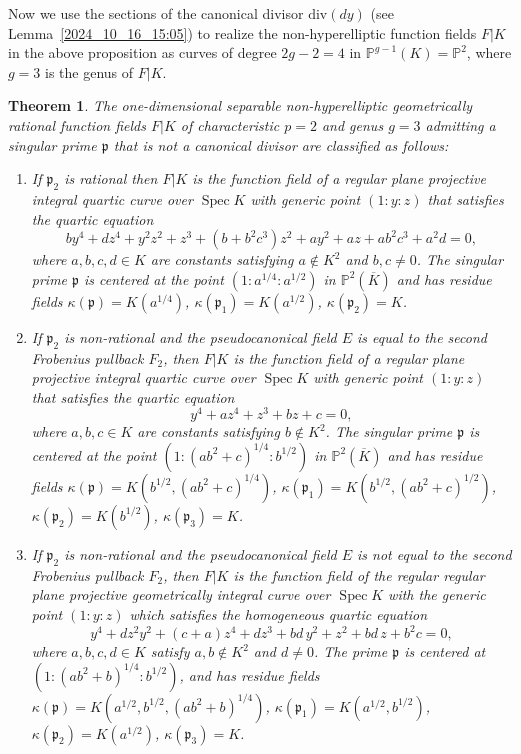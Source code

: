 \documentclass[12pt,reqno]{amsart}
\newtheorem{thm}{Theorem}[section]
\theoremstyle{definition}
\newcommand{\ov}{\overline}
\newcommand{\PP}{\mathbb{P}}
\newcommand{\pp}{\mathfrak{p}}
\newcommand{\ka}{\kappa}
\DeclareMathOperator{\Spec}{Spec}%
\begin{document}
Now we use the sections of the canonical divisor $\mathrm{div}(dy)$ (see Lemma~\ref{2024_10_16_15:05}) to realize the non-hyperelliptic function fields $F|K$ in the above proposition as curves of degree $2g-2=4$ in $\PP^{g-1}(K) = \PP^2$, where $g=3$ is the genus of $F|K$.

\begin{thm}\label{2024_05_27_00:10}
The one-dimensional separable non-hyperelliptic geometrically rational function fields $F|K$ of characteristic $p=2$ and genus $g=3$ admitting a singular prime $\pp$ that is not a canonical divisor are classified as follows:
\begin{enumerate}[\upshape (a)]
    \item \label{2024_05_27_00:11}
    If $\pp_2$ is rational then $F|K$ is the function field of a regular plane projective integral quartic curve over $\Spec K$ with generic point $(1: y : z)$ that satisfies the quartic equation
    \[ b y^4 + d z^4 + y^2 z^2 + z^3 + (b + b^2 c^3) z^2 + a y^2 + a z + a b^2 c^3 + a^2 d = 0, \]
    where $a,b,c,d\in K$ are constants satisfying $a\notin K^2$ and $b,c\neq 0$.
    The singular prime $\pp$ is centered at the point $(1:a^{1/4}:a^{1/2})$ in $\PP^2(\ov K)$ and has residue fields $\ka(\pp)=K(a^{1/4})$, $\ka(\pp_1)=K(a^{1/2})$, $\ka(\pp_2) = K$.
    
    \item \label{2024_05_27_00:12}
    If $\pp_2$ is non-rational and the pseudocanonical field $E$ is equal to the second Frobenius pullback $F_2$, then $F|K$ is the function field of a regular plane projective integral quartic curve over $\Spec K$ with generic point $(1:y:z)$ that satisfies the quartic equation
    \[ y^4 + a z^4 + z^3 + b z + c = 0, \]
    where $a,b,c \in K$ are constants satisfying $b \notin K^2$.
    The singular prime $\pp$ is centered at the point $(1:(a b^2 + c)^{1/4} : b^{1/2})$ in $\PP^2(\ov K)$ and has residue fields $\ka(\pp)=K(b^{1/2}, (a b^2 + c)^{1/4})$, $\ka(\pp_1)=K(b^{1/2}, (a b^2 + c)^{1/2})$, $\ka(\pp_2) = K(b^{1/2})$, $\ka(\pp_3)=K$.
    
    \item \label{2024_05_27_00:13}
    If $\pp_2$ is non-rational and the pseudocanonical field $E$ is not equal to the second Frobenius pullback $F_2$,
    then $F|K$ is the function field of the regular regular plane projective geometrically integral curve over $\Spec K$ with the generic point $(1:y:z)$ which satisfies the homogeneous quartic equation
    \[ y^4 + d z^2 y^2 + (c+a) z^4 + d z^3 + bd\, y^2 + z^2 + bd\, z + b^2 c = 0, \]
    where $a,b,c,d\in K$ satisfy $a,b\notin K^2$ and $d\neq 0$.
    The prime $\pp$ is centered at $(1:(a b^2 + b)^{1/4}:b^{1/2})$, and has residue fields $\ka(\pp) = K(a^{1/2}, b^{1/2}, (a b^2 + b)^{1/4})$, $\ka(\pp_1)=K(a^{1/2}, b^{1/2})$, $\ka(\pp_2) = K(a^{1/2})$, $\ka(\pp_3)=K$.
\end{enumerate}
\end{thm}
\end{document}
